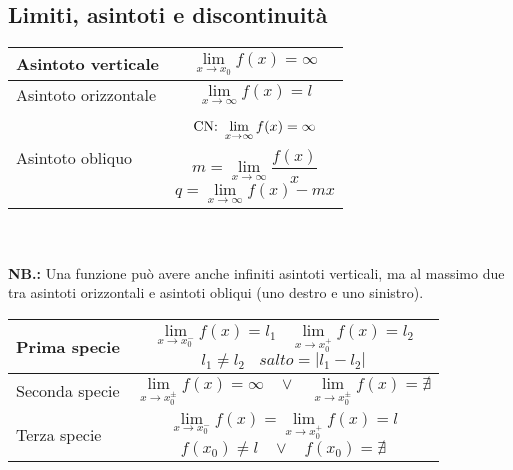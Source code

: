 \documentclass{article}     %
\begin{document}
    \subsection{Limiti, asintoti e discontinuità}
    \begin{tabular}{|m{}|m{}|}
        \hline
        Asintoto verticale&  \[\lim_{x\rightarrow x_0} f(x) = \infty\] \\\hline
        Asintoto orizzontale & \[\lim_{x\rightarrow \infty} f(x) = l\]\\ \hline
        Asintoto obliquo & \[\textnormal{CN: }\lim_{x\rightarrow\infty}f(x) = \infty\]
        \[m=\lim_{x\rightarrow\infty}\frac{f(x)}{x}\]
        \[q=\lim_{x\rightarrow\infty}f(x)-mx\] \\ \hline
    \end{tabular}\\
    \\
    \textbf{NB.:} Una funzione può avere anche infiniti asintoti verticali, ma al massimo due tra asintoti orizzontali e asintoti obliqui (uno destro e uno sinistro).\\    \begin{tabular}{|m{}|m{}|}
        \hline
        Prima specie &  \[\lim_{x\rightarrow x_0^-}f(x)=l_1~~~~\lim_{x\rightarrow x_0^+}f(x)=l_2\] \[l_1\neq l_2~~~~salto=|l_1-l_2|\]\\ \hline
        Seconda specie &  \[\lim_{x\rightarrow x_0^\pm}f(x)=\infty ~~~~\lor~~~~ \lim_{x\rightarrow x_0^\pm}f(x)=\nexists\] \\\hline
        Terza specie & \[\lim_{x\rightarrow x_0^-}f(x)=\lim_{x\rightarrow x_0^+}f(x)=l\]\[f(x_0)\neq l ~~~~ \lor ~~~~ f(x_0)=\nexists\]\\ \hline
    \end{tabular}
\end{document}
